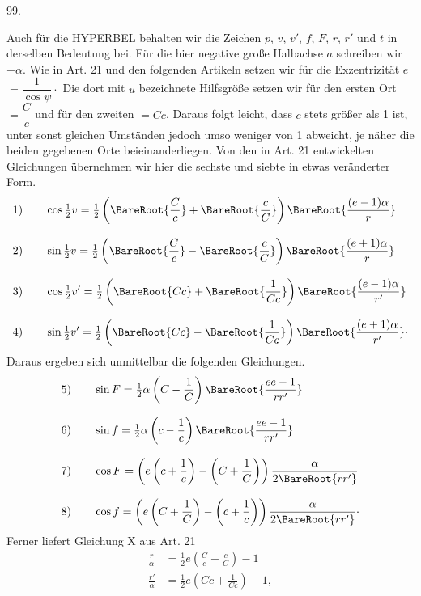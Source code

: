 \par{}\medskip
\hypertarget{native-137-article099}{}
\begin{center}99.\end{center}
Auch für die HYPERBEL behalten wir die Zeichen $p$, $v$, $v'$, $f$, $F$, $r$, $r'$ und $t$ in derselben Bedeutung bei. Für die hier negative große Halbachse $a$ schreiben wir $-\alpha$. Wie in Art. 21 und den folgenden Artikeln setzen wir für die Exzentrizität $e$ $=\dfrac1{\cos\psi}\mathpunct{\cdot}$ Die dort mit $u$ bezeichnete Hilfsgröße setzen wir für den ersten Ort $=\dfrac Cc$ und für den zweiten $=Cc$. Daraus folgt leicht, dass $c$ stets größer als 1 ist, unter sonst gleichen Umständen jedoch umso weniger von 1 abweicht, je näher die beiden gegebenen Orte beieinanderliegen. Von den in Art. 21 entwickelten Gleichungen übernehmen wir hier die sechste und siebte in etwas veränderter Form.
\[
\begin{aligned}
\mathrm{1)}\qquad&\cos\tfrac12v=\tfrac12\left(\BareRoot{\dfrac Cc}+\BareRoot{\dfrac cC}\right)\BareRoot{\dfrac{(e-1)\alpha}r}\\[.8em]
\mathrm{2)}\qquad&\sin\tfrac12v=\tfrac12\left(\BareRoot{\dfrac Cc}-\BareRoot{\dfrac cC}\right)\BareRoot{\dfrac{(e+1)\alpha}r}\\[.8em]
\mathrm{3)}\qquad&\cos\tfrac12v'=\tfrac12\left(\BareRoot{Cc}+\BareRoot{\dfrac1{Cc}}\right)\BareRoot{\dfrac{(e-1)\alpha}{r'}}\\[.8em]
\mathrm{4)}\qquad&\sin\tfrac12v'=\tfrac12\left(\BareRoot{Cc}-\BareRoot{\dfrac1{Cc}}\right)\BareRoot{\dfrac{(e+1)\alpha}{r'}}\mathpunct{\cdot}
\end{aligned}
\]
\noindent Daraus ergeben sich unmittelbar die folgenden Gleichungen.
\[
\begin{aligned}
\mathrm{5)}\qquad&\sin F=\tfrac12\alpha\left(C-\dfrac1C\right)\BareRoot{\dfrac{ee-1}{rr'}}\\[.8em]
\mathrm{6)}\qquad&\sin f=\tfrac12\alpha\left(c-\dfrac1c\right)\BareRoot{\dfrac{ee-1}{rr'}}\\[.8em]
\mathrm{7)}\qquad&\cos F=\left(e\left(c+\dfrac1c\right)-\left(C+\dfrac1C\right)\right)\dfrac\alpha{2\BareRoot{rr'}}\\[.8em]
\mathrm{8)}\qquad&\cos f=\left(e\left(C+\dfrac1C\right)-\left(c+\dfrac1c\right)\right)\dfrac\alpha{2\BareRoot{rr'}}\mathpunct{\cdot}
\end{aligned}
\]
\noindent Ferner liefert Gleichung X aus Art. 21
\[
\begin{aligned}
\frac r\alpha&=\tfrac12e\left(\frac Cc+\frac cC\right)-1\\[.6em]
\frac{r'}\alpha&=\tfrac12e\left(Cc+\frac1{Cc}\right)-1,
\end{aligned}
\]
